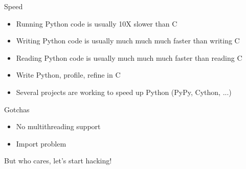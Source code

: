 \begin{frame}
  Speed
  \begin{itemize}
  \item Running Python code is usually 10X slower than C
  \item Writing Python code is usually much much much faster than writing C
  \item Reading Python code is usually much much much faster than reading C
  \item Write Python, profile, refine in C
  \item Several projects are working to speed up Python (PyPy, Cython, ...)
  \end{itemize}
\end{frame}

\begin{frame}
  Gotchas
  \begin{itemize}
  \item No multithreading support
  \item Import problem
  \end{itemize}
  But who cares, let's start hacking!
\end{frame}

